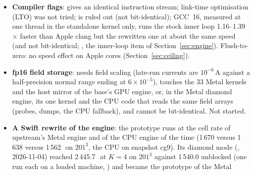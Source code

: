 \begin{itemize}
  loops gain less was not examined. A real version (halo lines per thread, every extension's line hooks per sub-step)
  would gain less. Not built (, section 2). On the GPU, diamond
  blocking is the fork's Metal engine
  (Section~\ref{sec:gpu}, with the tile schedule of luikore's engine, PR \#228~\cite{luikore228}). Both tests gave
  every thread a sub-grid of its own, and they stand as the record of that design. Upstream master's 
  engine blocks with all threads in one cache-sized
  tile, which is worth 1.15--1.49$\times$ to it on this machine (Section~\ref{sec:threebuilds}). That form was built
  on 2026-11-11 as an opt-in tiled sweep (patch 0040, Section~\ref{sec:tiled}): at 4 threads it ran patch x5 and a
  16.8\,M-cell box 1.08 and 1.23$\times$ as fast as the fused sweep at its best, and four other models at
  0.71--0.92$\times$, so it is a switch and the default sweep stays unblocked. Wavefront or diamond
  blocking~\cite{malas2015,fukaya2018} beyond that sweep's trapezoids along x was not tried on the CPU.
\item \textbf{Compiler flags}:  gives an identical instruction stream; link-time optimisation (LTO)
  was not tried;  is ruled out (not bit-identical); GCC~16, measured at one thread in the standalone
  kernel only, runs the stock inner loop 1.16--1.39$\times$ faster than Apple clang but the rewritten one at about the
  same speed (and not bit-identical; , the inner-loop item of
  Section~\ref{sec:engine}). Flush-to-zero: no speed effect on Apple cores (Section~\ref{sec:ceiling}).
\item \textbf{fp16 field storage}: needs field scaling (late-run currents are $10^{-6}$\,A against a half-precision
  normal range ending at $6\times10^{-5}$), touches the 33 Metal kernels and the host mirror of the base's GPU engine,
  or, in the Metal diamond engine, its one kernel and the CPU code that reads the same field arrays (probes, dumps,
  the CPU fallback), and cannot be bit-identical. Not started.
\item \textbf{A Swift rewrite of the engine}: the prototype runs at the cell rate of upstream's Metal engine and of the
  CPU engine of the time (1\,670 versus 1\,638 versus 1\,562\,\MC\ on $201^3$, the CPU on snapshot cg9). Its diamond
  mode (, 2026-11-04) reached 2\,445.7\,\MC\ at $K=4$ on $201^3$ against 1\,540.0 unblocked (one run
  each on a loaded machine, ) and became the prototype of the Metal

\end{itemize}
